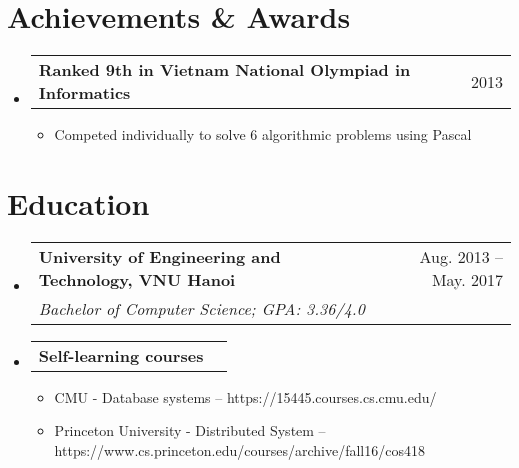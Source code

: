 \documentclass[a4paper,11pt]{article}
\makeatletter
\newcommand{\resumeItem}[1]{
  \item\small{
    {#1 \vspace{-2pt}}
  }
}
\newcommand{\resumeSubheadTwo}[2]{
  \vspace{-1pt}\item
    \begin{tabular*}{0.97\textwidth}{l@{\extracolsep{\fill}}r}
      \textbf{#1} & #2
    \end{tabular*}\vspace{-5pt}
}
\newcommand{\resumeSubhead}[3]{
  \vspace{-1pt}\item
    \begin{tabular*}{0.97\textwidth}{l@{\extracolsep{\fill}}r}
      \textbf{#1} & #2 \\
      \textit{\normalsize#3}
    \end{tabular*}\vspace{-5pt}
}
\newcommand{\resumeSubHeadingListStart}{\begin{itemize}[leftmargin=*]}
\newcommand{\resumeSubHeadingListEnd}{\end{itemize}}
\newcommand{\resumeItemListStart}{\begin{itemize}}
\newcommand{\resumeItemListEnd}{\end{itemize}\vspace{-5pt}}
\makeatother
\begin{document}
\section{Achievements \& Awards}
  \resumeSubHeadingListStart
    \resumeSubheadTwo
      {Ranked 9th in Vietnam National Olympiad in Informatics}{2013}
      \resumeItemListStart
        \resumeItem{Competed individually to solve 6 algorithmic problems using Pascal}
      \resumeItemListEnd
  \resumeSubHeadingListEnd



\section{Education}
  \resumeSubHeadingListStart
    \resumeSubhead
      {University of Engineering and Technology, VNU Hanoi}{Aug. 2013 -- May. 2017}
      {Bachelor of Computer Science;  GPA: 3.36/4.0}

    \resumeSubheadTwo
      {Self-learning courses}{}
      \resumeItemListStart
        \resumeItem{CMU - Database systems -- https://15445.courses.cs.cmu.edu/}
        \resumeItem{Princeton University - Distributed System -- https://www.cs.princeton.edu/courses/archive/fall16/cos418}
      \resumeItemListEnd
  \resumeSubHeadingListEnd
\end{document}
